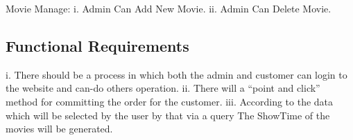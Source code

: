 \documentclass[12pt]{article}
\begin{document}
Movie Manage: 
i.	Admin Can Add New Movie. 
ii.	Admin Can Delete Movie.
\subsection{Functional Requirements}
i. There should be a process in which both the admin and customer can login to the website and can-do others operation.
ii. There will a “point and click” method for committing the order for the customer. 
iii. According to the data which will be selected by the user by that via a query The ShowTime of the movies will be generated.
\end{document}
